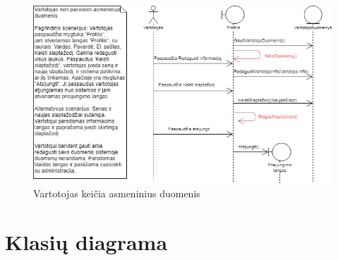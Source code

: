 \documentclass[oneside]{VUMIFPSkursinis}
\begin{document}
			\begin{figure}[h]
    				\centering
    				\includegraphics[width=1\textwidth]{seq14.png}
    				\caption{Vartotojas keičia asmeninius duomenis}
    				\label{fig:Vartotojas keičia asmeninius duomenis}
			\end{figure}

\section{Klasių diagrama}
\end{document}
